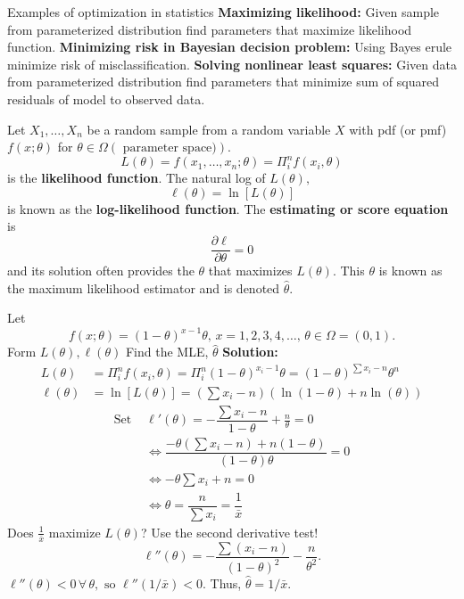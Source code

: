 \documentclass{article}
\begin{document}
 Examples of optimization in statistics
\bn
\im \textbf{Maximizing likelihood:} Given sample from parameterized distribution find parameters that maximize likelihood function. 
\im \textbf{Minimizing risk in Bayesian decision problem:} Using Bayes erule minimize risk of misclassification. 
\im \textbf{Solving nonlinear least squares:} Given data from parameterized distribution find parameters that minimize sum of squared residuals of model to observed data. 
\en 

 Let $X_1,\ldots,X_n$ be a random sample from a random variable $X$ with pdf (or pmf) $f(x;\theta)$ for $\theta \in \Omega (\text{ parameter space)})$. 
\bn
\im
\[
L(\theta) = f(x_1,\ldots,x_n;\theta) = \Pi_i^{n}f(x_i,\theta)
\]
is the \textbf{likelihood function}.     
\im The natural log of $L(\theta),$
\[
\ell(\theta)=\ln[L(\theta)]
\]
is known as the \textbf{log-likelihood function}. 
\im The \textbf{estimating or score equation} is 
\[ \frac{\partial \ell}{\partial \theta} = 0
\]
\en
and its solution often provides the $\theta$ that maximizes $L(\theta)$. This $\theta$ is known as the maximum likelihood estimator and is denoted $\hat{\theta}$. 

 Let
\[
f(x;\theta) = (1-\theta)^{x-1}\theta,\, x=1,2,3,4,\ldots, \, \theta \in \Omega = (0,1).
\]
\bn
\im Form $L(\theta), \ell(\theta)$
\im Find the MLE, $\hat{\theta}$
\en 
\textbf{Solution: } 
\bn 
\im 
\begin{align*} 
L(\theta) &= \Pi_i^n f(x_i,\theta) = \Pi_i^n (1-\theta)^{x_i-1}\theta = (1-\theta)^{\sum x_i - n}\theta^n \\
\ell(\theta) &= \ln[L(\theta)] = \left(\sum x_i -n\right)(\ln(1-\theta) + n\ln(\theta))
\end{align*} 
\im
\begin{align*} 
\text{Set } &\ell'(\theta) = -\dfrac{\sum x_i - n}{1-\theta} + \frac{n}{\theta} = 0 \\
&\iff  \dfrac{-\theta(\sum x_i - n) +n(1-\theta)}{(1-\theta)\theta} = 0 \\
&\iff -\theta \sum x_i + n = 0 \\
&\iff \theta = \dfrac{n}{\sum x_i} = \dfrac{1}{\bar{x}}  
\end{align*} 
\en 
Does $\frac{1}{\bar{x}}$ maximize $L(\theta)$? Use the second derivative test!
\[
\ell''(\theta) = -\dfrac{\sum(x_i-n)}{(1-\theta)^2} - \dfrac{n}{\theta^2}.
\]
$\ell''(\theta) < 0 \, \forall \, \theta, \text{ so } \ell''(1/\bar{x})<0$. Thus, $\hat{\theta} = 1/\bar{x}$. 
\end{document}
